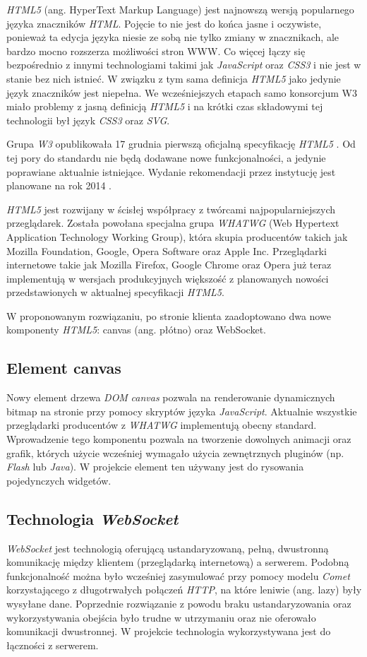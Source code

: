 \emph{HTML5} (ang. HyperText Markup Language) jest najnowszą wersją popularnego języka znaczników \emph{HTML}. Pojęcie to nie jest do końca jasne i oczywiste, ponieważ ta edycja języka niesie ze sobą nie tylko zmiany w znacznikach, ale bardzo mocno rozszerza możliwości stron WWW. Co więcej łączy się bezpośrednio z innymi technologiami takimi jak \emph{JavaScript} oraz \emph{CSS3} i nie jest w stanie bez nich istnieć. W związku z tym sama definicja \emph{HTML5} jako jedynie język znaczników jest niepełna. We wcześniejszych etapach samo konsorcjum W3 miało problemy z jasną definicją \emph{HTML5} i na krótki czas składowymi tej technologii był język \emph{CSS3} oraz \emph{SVG}. \cite{html5games}

Grupa \emph{W3} opublikowała 17 grudnia pierwszą oficjalną specyfikację \emph{HTML5} \cite{html5w3}. Od tej pory do standardu nie będą dodawane nowe funkcjonalności, a jedynie poprawiane aktualnie istniejące. Wydanie rekomendacji przez instytucję jest planowane na rok 2014 \cite{plan2014}.

\emph{HTML5} jest rozwijany w ścisłej współpracy z twórcami najpopularniejszych przeglądarek. Została powołana specjalna grupa \emph{WHATWG} (Web Hypertext Application Technology Working Group), która skupia producentów takich jak Mozilla Foundation, Google, Opera Software oraz Apple Inc. Przeglądarki internetowe takie jak Mozilla Firefox, Google Chrome oraz Opera już teraz implementują w wersjach produkcyjnych większość z planowanych nowości przedstawionych w aktualnej specyfikacji \emph{HTML5}.

W proponowanym rozwiązaniu, po stronie klienta zaadoptowano dwa nowe komponenty \emph{HTML5}: canvas (ang. płótno) oraz WebSocket.

\subsection{Element canvas}
Nowy element drzewa \emph{DOM} \emph{canvas} pozwala na renderowanie dynamicznych bitmap na stronie przy pomocy skryptów języka \emph{JavaScript}. Aktualnie wszystkie przeglądarki producentów z \emph{WHATWG} implementują obecny standard.
Wprowadzenie tego komponentu pozwala na tworzenie dowolnych animacji oraz grafik, których użycie wcześniej wymagało użycia zewnętrznych pluginów (np. \emph{Flash} lub \emph{Java}).
W projekcie element ten używany jest do rysowania pojedynczych widgetów.

\subsection{Technologia \emph{WebSocket}}
\emph{WebSocket} jest technologią oferującą ustandaryzowaną, pełną, dwustronną komunikację między klientem (przeglądarką internetową) a serwerem. Podobną funkcjonalność można było wcześniej zasymulować przy pomocy modelu \emph{Comet} korzystającego z długotrwałych połączeń \emph{HTTP}, na które leniwie (ang. lazy) były wysyłane dane. Poprzednie rozwiązanie z powodu braku ustandaryzowania oraz wykorzystywania obejścia było trudne w utrzymaniu oraz nie oferowało komunikacji dwustronnej.
W projekcie technologia wykorzystywana jest do łączności z serwerem.
